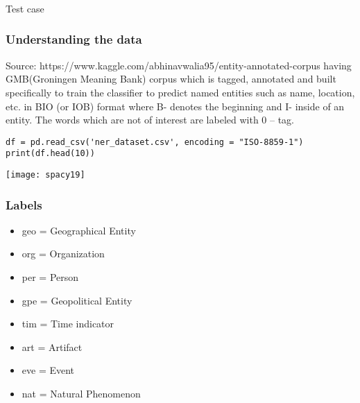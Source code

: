 \begin{frame}[fragile]\frametitle{}

\begin{center}
{\Large Test case}
\end{center}
\end{frame}

\begin{frame}[fragile]\frametitle{Understanding the data}

Source: https://www.kaggle.com/abhinavwalia95/entity-annotated-corpus having GMB(Groningen Meaning Bank) corpus which is tagged, annotated and built specifically to train the classifier to predict named entities such as name, location, etc. in BIO (or IOB) format where  B- denotes the beginning and I- inside of an entity. The words which are not of interest are labeled with 0 – tag.

\begin{lstlisting}
df = pd.read_csv('ner_dataset.csv', encoding = "ISO-8859-1")
print(df.head(10))
\end{lstlisting}


\begin{center}
\texttt{[image: spacy19]}
\end{center}

\end{frame}




\begin{frame}[fragile]\frametitle{Labels}
  \begin{itemize}
  \item geo = Geographical Entity
  \item org = Organization
  \item per = Person
  \item gpe = Geopolitical Entity
  \item tim = Time indicator
  \item art = Artifact
  \item eve = Event
  \item nat = Natural Phenomenon
  \end{itemize}
	

\end{frame}

